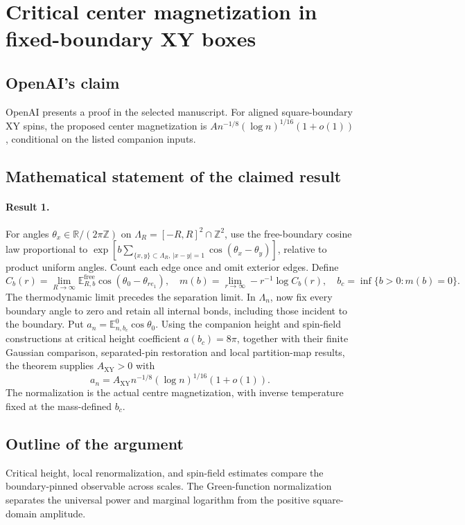 \documentclass[11pt]{article}
\begin{document}
\section*{Critical center magnetization in fixed-boundary XY boxes}

\subsection{OpenAI's claim}
OpenAI presents a proof in the selected manuscript. For aligned square-boundary XY spins, the proposed center magnetization is $A n^{-1/8}(\log n)^{1/16}(1+o(1))$, conditional on the listed companion inputs.

\subsection{Mathematical statement of the claimed result}
\paragraph{Result 1.} For angles $\theta_x\in\mathbb R/(2\pi\mathbb Z)$ on $\Lambda_R=[-R,R]^2\cap\mathbb Z^2$, use the free-boundary cosine law proportional to $\exp[b\sum_{\{x,y\}\subset\Lambda_R,\,|x-y|=1}\cos(\theta_x-\theta_y)]$, relative to product uniform angles. Count each edge once and omit exterior edges. Define
\[
 C_b(r)=\lim_{R\to\infty}\mathbb E_{R,b}^{\mathrm{free}}\cos(\theta_0-\theta_{re_1}),\quad
 m(b)=\lim_{r\to\infty}-r^{-1}\log C_b(r),\quad b_c=\inf\{b>0:m(b)=0\}.
\]
The thermodynamic limit precedes the separation limit. In $\Lambda_n$, now fix every boundary angle to zero and retain all internal bonds, including those incident to the boundary. Put $a_n=\mathbb E_{n,b_c}^{0}\cos\theta_0$. Using the companion height and spin-field constructions at critical height coefficient $a(b_c)=8\pi$, together with their finite Gaussian comparison, separated-pin restoration and local partition-map results, the theorem supplies $A_{\mathrm{XY}}>0$ with
\[
 a_n=A_{\mathrm{XY}}n^{-1/8}(\log n)^{1/16}(1+o(1)).
\]
The normalization is the actual centre magnetization, with inverse temperature fixed at the mass-defined $b_c$.

\subsection{Outline of the argument}
Critical height, local renormalization, and spin-field estimates compare the boundary-pinned observable across scales. The Green-function normalization separates the universal power and marginal logarithm from the positive square-domain amplitude.
\end{document}
